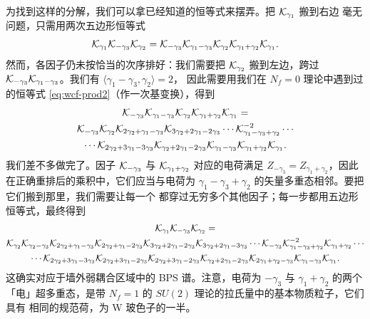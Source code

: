 为找到这样的分解，我们可以拿已经知道的恒等式来摆弄。把 $\mathcal{K}_{\gamma_1}$ 搬到右边
毫无问题，只需用两次五边形恒等式
\begin{equation}
\mathcal{K}_{\gamma_1} \mathcal{K}_{-\gamma_3} \mathcal{K}_{\gamma_2} = \mathcal{K}_{-\gamma_3} \mathcal{K}_{\gamma_1-\gamma_3}
\mathcal{K}_{\gamma_2} \mathcal{K}_{\gamma_1+\gamma_2}\mathcal{K}_{\gamma_1}.
\end{equation}
然而，各因子仍未按恰当的次序排好：我们需要把 $\mathcal{K}_{\gamma_2}$ 搬到左边，跨过
$\mathcal{K}_{-\gamma_3} \mathcal{K}_{\gamma_1-\gamma_3}$。我们有 $\langle \gamma_1-\gamma_3, \gamma_2 \rangle=2$，
因此需要用我们在 $N_f=0$ 理论中遇到过的恒等式 \eqref{eq:wcf-prod2}（作一次基变换），得到
\begin{multline}
\mathcal{K}_{-\gamma_3} \mathcal{K}_{\gamma_1-\gamma_3}\mathcal{K}_{\gamma_2} \mathcal{K}_{\gamma_1+\gamma_2}\mathcal{K}_{\gamma_1}
= \\ \mathcal{K}_{-\gamma_3} \mathcal{K}_{\gamma_2} \mathcal{K}_{2 \gamma_2 +\gamma_1-\gamma_3} \mathcal{K}_{3 \gamma_2 +2\gamma_1-2\gamma_3}\cdots
\mathcal{K}_{\gamma_1-\gamma_3+ \gamma_2}^{-2}\cdots \\ \cdots \mathcal{K}_{2\gamma_2 +3\gamma_1-3\gamma_3}\mathcal{K}_{\gamma_2 +2\gamma_1-2\gamma_3}\mathcal{K}_{\gamma_1-\gamma_3} \mathcal{K}_{\gamma_1+\gamma_2}\mathcal{K}_{\gamma_1}.
\end{multline}
我们差不多做完了。因子 $\mathcal{K}_{-\gamma_3}$ 与 $\mathcal{K}_{\gamma_1+\gamma_2}$ 对应的电荷满足
$Z_{-\gamma_3} = Z_{\gamma_1 + \gamma_2}$，因此在正确重排后的乘积中，它们应当与电荷为
$\gamma_1 - \gamma_3 + \gamma_2$ 的矢量多重态相邻。要把它们搬到那里，我们需要让每一个
都穿过无穷多个其他因子；每一步都用五边形恒等式，最终得到
\begin{multline}
\mathcal{K}_{\gamma_1} \mathcal{K}_{-\gamma_3} \mathcal{K}_{\gamma_2} = \\
\mathcal{K}_{\gamma_2}\mathcal{K}_{\gamma_2-\gamma_3} \mathcal{K}_{2 \gamma_2 +\gamma_1-\gamma_3}\mathcal{K}_{2 \gamma_2 +\gamma_1-2\gamma_3} \mathcal{K}_{3 \gamma_2 +2\gamma_1-2\gamma_3}\mathcal{K}_{3 \gamma_2 +2\gamma_1-3\gamma_3}\cdots
\mathcal{K}_{-\gamma_3} \mathcal{K}_{\gamma_1-\gamma_3+ \gamma_2}^{-2} \mathcal{K}_{\gamma_1+\gamma_2}\cdots \\ \cdots \mathcal{K}_{2\gamma_2 +3\gamma_1-3\gamma_3}\mathcal{K}_{2\gamma_2 +3\gamma_1-2\gamma_3}
\mathcal{K}_{2\gamma_2 +3\gamma_1-2\gamma_3}\mathcal{K}_{\gamma_2 +2\gamma_1-2\gamma_3}\mathcal{K}_{2\gamma_1+\gamma_2-\gamma_3}\mathcal{K}_{\gamma_1-\gamma_3}\mathcal{K}_{\gamma_1}.
\end{multline}
这确实对应于墙外弱耦合区域中的 BPS 谱。注意，电荷为 $-\gamma_3$ 与 $\gamma_1 + \gamma_2$
的两个「电」超多重态，是带 $N_f=1$ 的 $SU(2)$ 理论的拉氏量中的基本物质粒子，它们具有
相同的规范荷，为 W 玻色子的一半。

